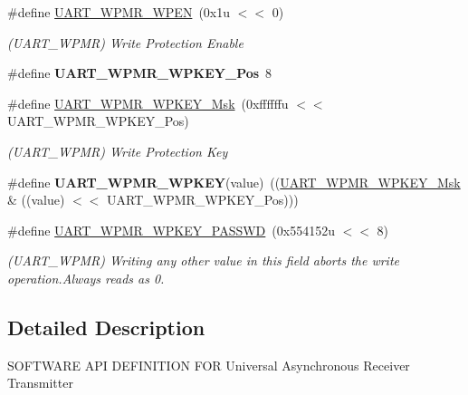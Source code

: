 \begin{DoxyCompactItemize}
\#define \mbox{\hyperlink{group__SAMS70__UART_gab930e465c6acf9e610bd01ebb4bf6668}{U\+A\+R\+T\+\_\+\+W\+P\+M\+R\+\_\+\+W\+P\+EN}}~(0x1u $<$$<$ 0)
\begin{DoxyCompactList}\small\item\em (U\+A\+R\+T\+\_\+\+W\+P\+MR) Write Protection Enable \end{DoxyCompactList}\item 
\mbox{\label{group__SAMS70__UART_ga1cbbb3d466864d74e7e13d946b832700}} 
\#define {\bfseries U\+A\+R\+T\+\_\+\+W\+P\+M\+R\+\_\+\+W\+P\+K\+E\+Y\+\_\+\+Pos}~8
\item 
\mbox{\label{group__SAMS70__UART_ga4b752d7c7446393d83f3a3377ec85d5c}} 
\#define \mbox{\hyperlink{group__SAMS70__UART_ga4b752d7c7446393d83f3a3377ec85d5c}{U\+A\+R\+T\+\_\+\+W\+P\+M\+R\+\_\+\+W\+P\+K\+E\+Y\+\_\+\+Msk}}~(0xffffffu $<$$<$ U\+A\+R\+T\+\_\+\+W\+P\+M\+R\+\_\+\+W\+P\+K\+E\+Y\+\_\+\+Pos)
\begin{DoxyCompactList}\small\item\em (U\+A\+R\+T\+\_\+\+W\+P\+MR) Write Protection Key \end{DoxyCompactList}\item 
\mbox{\label{group__SAMS70__UART_ga4ce861fd8b265686f0bca931168fa1de}} 
\#define {\bfseries U\+A\+R\+T\+\_\+\+W\+P\+M\+R\+\_\+\+W\+P\+K\+EY}(value)~((\mbox{\hyperlink{group__SAMV71__UART_ga4b752d7c7446393d83f3a3377ec85d5c}{U\+A\+R\+T\+\_\+\+W\+P\+M\+R\+\_\+\+W\+P\+K\+E\+Y\+\_\+\+Msk}} \& ((value) $<$$<$ U\+A\+R\+T\+\_\+\+W\+P\+M\+R\+\_\+\+W\+P\+K\+E\+Y\+\_\+\+Pos)))
\item 
\mbox{\label{group__SAMS70__UART_ga9f359612234f83812e577e2dfcf2b5ec}} 
\#define \mbox{\hyperlink{group__SAMS70__UART_ga9f359612234f83812e577e2dfcf2b5ec}{U\+A\+R\+T\+\_\+\+W\+P\+M\+R\+\_\+\+W\+P\+K\+E\+Y\+\_\+\+P\+A\+S\+S\+WD}}~(0x554152u $<$$<$ 8)
\begin{DoxyCompactList}\small\item\em (U\+A\+R\+T\+\_\+\+W\+P\+MR) Writing any other value in this field aborts the write operation.\+Always reads as 0. \end{DoxyCompactList}\end{DoxyCompactItemize}


\subsection{Detailed Description}
S\+O\+F\+T\+W\+A\+RE A\+PI D\+E\+F\+I\+N\+I\+T\+I\+ON F\+OR Universal Asynchronous Receiver Transmitter 
